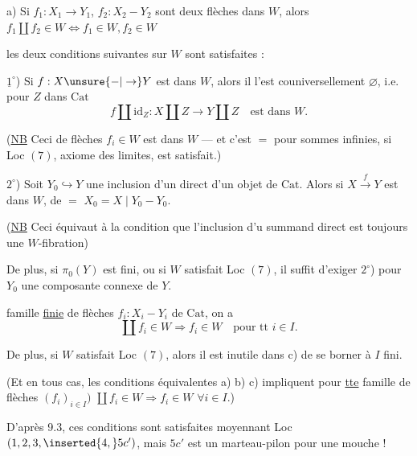 a) Si $f_1:X_1\to Y_1$, $f_2:X_2-Y_2$ sont deux flèches dans $W$, alors $f_1\amalg f_2\in W\iff f_1\in W,f_2\in W$

  les deux conditions suivantes sur $W$ sont satisfaites :

$\underline{1}^{\circ}$) Si $f:X\unsure{-|\to}Y$ est dans $W$, alors il l'est couniversellement  $\varnothing$, i.e. pour  $Z$ dans $\mathrm{Cat}$
\[
 f\amalg\mathrm{id}_Z:X\amalg Z\longrightarrow Y\amalg Z\quad\text{est dans }W.
\]

(\uline{NB} Ceci   de flèches $f_i\in W$ est dans $W$ --- et c'est $=$ pour sommes infinies, si Loc $(7)$, axiome des limites, est satisfait.)

$2^\circ$) Soit $Y_0\hookrightarrow Y$ une inclusion d'un  direct d'un objet de $\mathrm{Cat}$. Alors si $X\xrightarrow{f}Y$ est dans $W$, de $=$ $X_0=X\mid Y_0-Y_0$.

(\uline{NB} Ceci équivaut à la condition que l'inclusion d'u summand direct  est toujours une $W$-fibration)

De plus, si $\pi_0(Y)$ est fini, ou si $W$ satisfait Loc $(7)$, il suffit  d'exiger $2^\circ$) pour $Y_0$ une composante connexe de $Y$.

   famille \uline{finie}  de flèches  $f_i:X_i-Y_i$ de $\mathrm{Cat}$,  on a
\[
 \coprod f_i\in W\Longrightarrow f_i\in W\quad\text{pour tt }i\in I.
\]

De plus, si $W$ satisfait Loc $(7)$, alors il est inutile dans c) de se borner à $I$ fini.

(Et en tous cas, les conditions équivalentes a) b) c) impliquent pour \uline{tte} famille de flèches $(f_i)_{i\in I})$\unsure{;|,}  $\coprod f_i\in W\Rightarrow f_i\in W$ $\forall i\in I$.)

 \unsure{,}

D'après 9.3, ces conditions sont satisfaites moyennant Loc $(1,2,3,\inserted{4,}5c')$, mais $5c'$ est un marteau-pilon pour une mouche !

